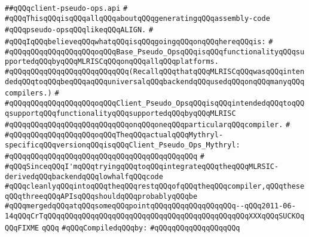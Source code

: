 \label{src/lib/compiler/back/low/mcg/client-pseudo-ops.api}
\verb|##qQQqclient-pseudo-ops.api|\newline
\verb|#|\newline
\verb|#qQQqThisqQQqisqQQqallqQQqaboutqQQqgeneratingqQQqassembly-code|\newline
\verb|#qQQqpseudo-opsqQQqlikeqQQqALIGN.|\newline
\verb|#|\newline
\verb|#qQQqIqQQqbelieveqQQqwhatqQQqisqQQqgoingqQQqonqQQqhereqQQqis:|\newline
\verb|#|\newline
\verb|#qQQqqQQqqQQqqQQqqQQqoqQQqBase_Pseudo_OpsqQQqisqQQqfunctionalityqQQqsupportedqQQqbyqQQqMLRISCqQQqonqQQqallqQQqplatforms.|\newline
\verb|#qQQqqQQqqQQqqQQqqQQqqQQqqQQq(RecallqQQqthatqQQqMLRISCqQQqwasqQQqintendedqQQqtoqQQqbeqQQqaqQQquniversalqQQqbackendqQQqusedqQQqonqQQqmanyqQQqcompilers.)|\newline
\verb|#|\newline
\verb|#qQQqqQQqqQQqqQQqqQQqoqQQqClient_Pseudo_OpsqQQqisqQQqintendedqQQqtoqQQqsupportqQQqfunctionalityqQQqsupportedqQQqbyqQQqMLRISC|\newline
\verb|#qQQqqQQqqQQqqQQqqQQqqQQqqQQqonqQQqoneqQQqparticularqQQqcompiler.|\newline
\verb|#|\newline
\verb|#qQQqqQQqqQQqqQQqqQQqoqQQqTheqQQqactualqQQqMythryl-specificqQQqversionqQQqisqQQqClient_Pseudo_Ops_Mythryl:|\newline
\verb|#qQQqqQQqqQQqqQQqqQQqqQQqqQQqqQQqqQQqqQQqqQQq|\newline
\verb|#|\newline
\verb|#qQQqSinceqQQqI'mqQQqtryingqQQqtoqQQqintegrateqQQqtheqQQqMLRSIC-derivedqQQqbackendqQQqlowhalfqQQqcode|\newline
\verb|#qQQqcleanlyqQQqintoqQQqtheqQQqrestqQQqofqQQqtheqQQqcompiler,qQQqtheseqQQqthreeqQQqAPIsqQQqshouldqQQqprobablyqQQqbe|\newline
\verb|#qQQqmergedqQQqatqQQqsomeqQQqpointqQQqqQQqqQQqqQQqqQQq--qQQq2011-06-14qQQqCrTqQQqqQQqqQQqqQQqqQQqqQQqqQQqqQQqqQQqqQQqqQQqqQQqXXXqQQqSUCKOqQQqFIXME|\newline
\verb|qQQq|\newline
\verb|#qQQqCompiledqQQqby:|\newline
\verb|#qQQqqQQqqQQqqQQqqQQq|\newline
